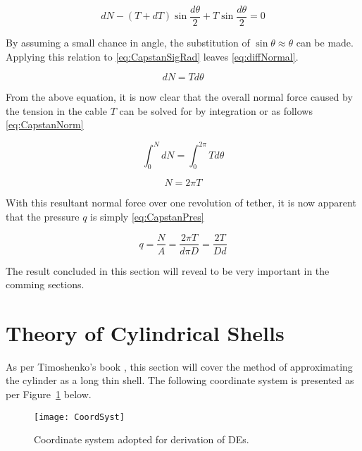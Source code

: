 \begin{equation}
	\label{eq:CapstanSigRad}
	dN-(T+dT)\sin \frac{d\theta}{2}+T\sin \frac{d\theta}{2}= 0
\end{equation}

By assuming a small chance in angle, the substitution of $\sin \theta \approx \theta$ can be made. Applying this relation to \ref{eq:CapstanSigRad} leaves \ref{eq:diffNormal}.

\begin{equation}
	\label{eq:diffNormal}
	dN = T d\theta
\end{equation}

From the above equation, it is now clear that the overall normal force caused by the tension in the cable $T$ can be solved for by integration or as follows \ref{eq:CapstanNorm}

\begin{equation}
	\int_0^N dN =\int_0^{2\pi} T d\theta
\end{equation}

\begin{equation}
	\label{eq:CapstanNorm}
	N=2\pi T	
\end{equation}

With this resultant normal force over one revolution of tether, it is now apparent that the pressure $q$ is simply \ref{eq:CapstanPres}

\begin{equation}
	\label{eq:CapstanPres}
	q=\frac{N}{A}=\frac{2\pi T}{d\pi D}=\frac{2T}{Dd}
\end{equation}

The result concluded in this section will reveal to be very important in the comming sections.

\section{Theory of Cylindrical Shells}

As per Timoshenko's book \citep{timoshenko1959theory}, this section will cover the method of approximating the cylinder as a long thin shell. The following coordinate system is presented as per Figure~\ref{fig:CoordSyst} below.

\begin{figure}[!htbp]
	\centering
	\texttt{[image: CoordSyst]}
	\caption{Coordinate system adopted for derivation of DEs.}
	\label{fig:CoordSyst}
\end{figure}

